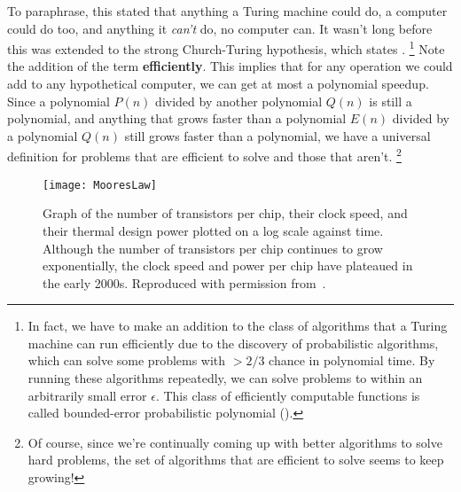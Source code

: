 To paraphrase, this stated that anything a Turing machine could do, a computer could do too, and anything
it \emph{can't} do, no computer can. It wasn't long before this was extended to the strong Church-Turing
hypothesis, which states .
\footnote{In fact, we have to make an addition to the class of algorithms that a Turing machine can run efficiently
 due to the discovery of probabilistic algorithms, which can solve some problems with $> 2/3$ chance in
 polynomial time. By running these algorithms repeatedly, we can solve problems to within an arbitrarily small 
 error $\epsilon$. This class of efficiently computable functions is called bounded-error probabilistic polynomial ().}
Note the addition of the term \textbf{efficiently}. This implies that for any
operation we could add to any hypothetical computer, we can get at most a polynomial speedup. Since
a polynomial $P(n)$ divided by another polynomial $Q(n)$ is still a polynomial, and anything that grows faster
than a polynomial $E(n)$ divided by a polynomial $Q(n)$ still grows faster than a polynomial, we have
a universal definition for problems that are efficient to solve and those that aren't.
\footnote{Of course, since we're continually coming up with better algorithms to solve hard problems,
the set of algorithms that are efficient to solve seems to keep growing!}


\begin{figure}
  \texttt{[image: MooresLaw]}
  \caption[Moore's Law and the end of exponential scaling]
  {Graph of the number of transistors per chip, their clock speed, and their
  thermal design power plotted on a log scale against time. Although the number of transistors per chip
  continues to grow exponentially, the clock speed and power per chip have plateaued in the early 2000s.
  Reproduced with permission from~\cite{cross_2016}.}
  \label{fig:mooreslaw}
\end{figure}

